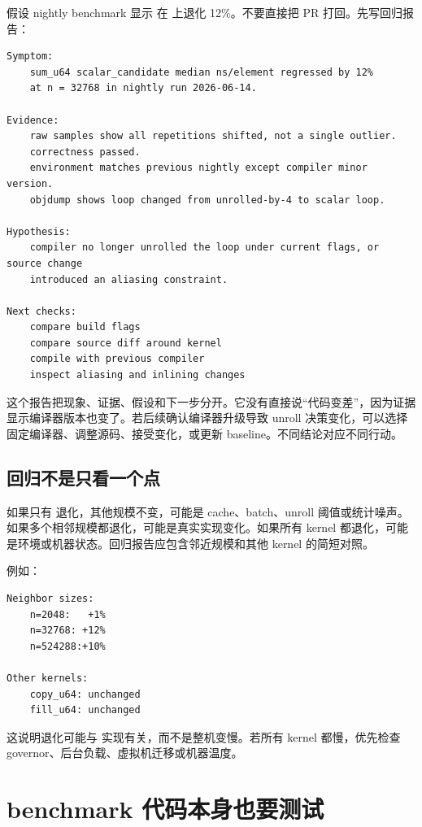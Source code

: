 假设 nightly benchmark 显示  在  上退化 12\%。不要直接把 PR 打回。先写回归报告：

\begin{lstlisting}
Symptom:
    sum_u64 scalar_candidate median ns/element regressed by 12%
    at n = 32768 in nightly run 2026-06-14.

Evidence:
    raw samples show all repetitions shifted, not a single outlier.
    correctness passed.
    environment matches previous nightly except compiler minor version.
    objdump shows loop changed from unrolled-by-4 to scalar loop.

Hypothesis:
    compiler no longer unrolled the loop under current flags, or source change
    introduced an aliasing constraint.

Next checks:
    compare build flags
    compare source diff around kernel
    compile with previous compiler
    inspect aliasing and inlining changes
\end{lstlisting}

这个报告把现象、证据、假设和下一步分开。它没有直接说“代码变差”，因为证据显示编译器版本也变了。若后续确认编译器升级导致 unroll 决策变化，可以选择固定编译器、调整源码、接受变化，或更新 baseline。不同结论对应不同行动。

\subsection{回归不是只看一个点}

如果只有  退化，其他规模不变，可能是 cache、batch、unroll 阈值或统计噪声。如果多个相邻规模都退化，可能是真实实现变化。如果所有 kernel 都退化，可能是环境或机器状态。回归报告应包含邻近规模和其他 kernel 的简短对照。

例如：

\begin{lstlisting}
Neighbor sizes:
    n=2048:   +1%
    n=32768: +12%
    n=524288:+10%

Other kernels:
    copy_u64: unchanged
    fill_u64: unchanged
\end{lstlisting}

这说明退化可能与  实现有关，而不是整机变慢。若所有 kernel 都慢，优先检查 governor、后台负载、虚拟机迁移或机器温度。

\section{benchmark 代码本身也要测试}

